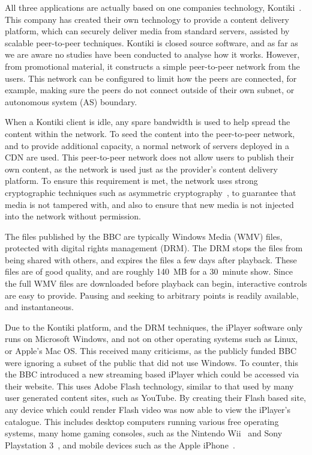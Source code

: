     All three applications are actually based on one companies technology, Kontiki~\cite{Kontiki}. This company has created their own technology to provide a content delivery platform, which can securely deliver media from standard servers, assisted by scalable peer-to-peer techniques. Kontiki is closed source software, and as far as we are aware no studies have been conducted to analyse how it works. However, from promotional material, it constructs a simple peer-to-peer network from the users. This network can be configured to limit how the peers are connected, for example, making sure the peers do not connect outside of their own subnet, or autonomous system (AS) boundary.

    When a Kontiki client is idle, any spare bandwidth is used to help spread the content within the network. To seed the content into the peer-to-peer network, and to provide additional capacity, a normal network of servers deployed in a CDN are used. This peer-to-peer network does not allow users to publish their own content, as the network is used just as the provider's content delivery platform. To ensure this requirement is met, the network uses strong cryptographic techniques such as asymmetric cryptography~\cite{rivest1978mfo}, to guarantee that media is not tampered with, and also to ensure that new media is not injected into the network without permission.

    The files published by the BBC are typically Windows Media (WMV) files, protected with digital rights management (DRM). The DRM stops the files from being shared with others, and expires the files a few days after playback. These files are of good quality, and are roughly 140~MB for a 30~minute show. Since the full WMV files are downloaded before playback can begin, interactive controls are easy to provide. Pausing and seeking to arbitrary points is readily available, and instantaneous.

    Due to the Kontiki platform, and the DRM techniques, the iPlayer software only runs on Microsoft Windows, and not on other operating systems such as Linux, or Apple's Mac OS. This received many criticisms, as the publicly funded BBC were ignoring a subset of the public that did not use Windows. To counter, this the BBC introduced a new streaming based iPlayer which could be accessed via their website. This uses Adobe Flash technology, similar to that used by many user generated content sites, such as YouTube. By creating their Flash based site, any device which could render Flash video was now able to view the iPlayer's catalogue. This includes desktop computers running various free operating systems, many home gaming consoles, such as the Nintendo Wii~\cite{bbc2008ban} and Sony Playstation 3~\cite{purchese2008fmb}, and mobile devices such as the Apple iPhone~\cite{bbc2008bic}.

